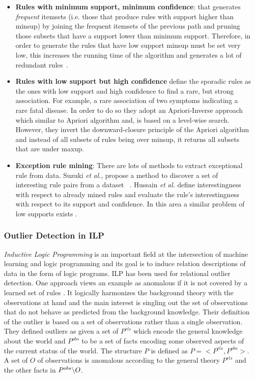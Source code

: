 \begin{itemize}
	\item \textbf{Rules with minimum support, minimum confidence}: that generates \textit{frequent} itemsets (i.e. those that produce rules with support higher than minsup) by joining the frequent itemsets of the previous path and pruning those subsets that have a support lower than minimum support. Therefore, in order to generate the rules that have low support minsup must be set very low, this increases the running time of the algorithm and generates a lot of redundant rules~\cite{Agrawal1994}. 
	\item \textbf{Rules with low support but high confidence} \cite{Koh2005} define the sporadic rules as the ones with low support and high confidence to find a rare, but strong association. For example, a rare association of two symptoms indicating a rare fatal disease. In order to do so they adopt an Apriori-Inverse approach which similar to Apriori algorithm and, is based on a level-wise search. However, they invert the downward-closure principle of the Apriori algorithm and instead of all subsets of rules being over minsup, it returns all subsets that are under maxup. 
	\item \textbf{Exception rule mining}: There are lots of methods to extract exceptional rule from data. Suzuki {\em et al.}, propose a method to discover a set of interesting rule pairs from a dataset  ~\cite{Suzuki04}. Hussain {\em et al.} define interestingness with respect to already mined rules and evaluate the rule's interestingness with respect to its support and confidence. In this area a similar problem of low supports exists  \cite{Hussain00}. 
\end{itemize}


\subsubsection{Outlier Detection in ILP}
\textit{Inductive Logic Programming} is an important field at the intersection of machine learning and logic programming and its goal is to induce relation descriptions of data in the form of logic programs. ILP has been used for relational outlier detection. One approach views an example as anomalous if it is not covered by a learned set of rules \cite{Angiulli2007}. It logically harmonizes the background theory with the observations at hand and the main interest is singling out the set of observations that do not behave as predicted from the background knowledge. Their definition of the outlier is based on a set of observations rather than a single observation.
They defined outliers as given a set of $P^{rls}$ which encode the general knowledge about the world and  $P^{obs}$ to be a set of facts encoding some observed aspects of the current status of the world. The structure $P$ is defined as $P=<P^{rls}, P^{obs}>$. A set of $O$ of observations is anomalous according to the general theory $P^{rls}$ and the other facts in $P^{obs}\char`\\ O$.

